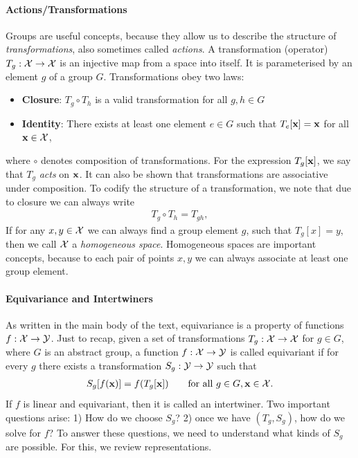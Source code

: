 \paragraph{Actions/Transformations}
Groups are useful concepts, because they allow us to describe the structure of \emph{transformations}, also sometimes called \emph{actions}. A transformation (operator) $T_g: \mathcal{X} \to \mathcal{X}$ is an injective map from a space into itself. It is parameterised by an element $g$ of a group $G$. Transformations obey two laws:
\begin{itemize}
    \item \textbf{Closure}: $T_g \circ T_h$ is a valid transformation for all $g, h \in G$
    \item \textbf{Identity}: There exists at least one element $e \in G$ such that $T_e[\textbf{x}] = \textbf{x}$ for all $\textbf{x} \in \mathcal{X}$,
\end{itemize}
where $\circ$ denotes composition of transformations. For the expression $T_g[\textbf{x}]$, we say that $T_g$ \emph{acts} on $\textbf{x}$. It can also be shown that transformations are associative under composition. To codify the structure of a transformation, we note that due to closure we can always write
\begin{align}
    T_g \circ T_h = T_{gh},
\end{align}
If for any $x, y \in \mathcal{X}$ we can always find a group element $g$, such that $T_g[x] = y$, then we call $\mathcal{X}$ a \emph{homogeneous space}. Homogeneous spaces are important concepts, because to each pair of points $x, y$ we can always associate at least one group element.

\paragraph{Equivariance and Intertwiners}
As written in the main body of the text, equivariance is a property of functions $f: \mathcal{X} \to \mathcal{Y}$. Just to recap, given a set of transformations $T_g: \mathcal{X} \to \mathcal{X}$ for $g \in G$, where $G$ is an abstract group, a function $f: \mathcal{X} \to \mathcal{Y}$ is called equivariant if for every $g$ there exists a transformation $S_g: \mathcal{Y} \to \mathcal{Y}$ such that
\begin{align}
    S_g[f(\textbf{x})] = f(T_g[\textbf{x}]) \qquad \text{for all } g\in G, \textbf{x}\in \mathcal{X}.
\end{align}
If $f$ is linear and equivariant, then it is called an intertwiner. Two important questions arise: 1) How do we choose $S_g$? 2) once we have $(T_g, S_g)$, how do we solve for $f$? To answer these questions, we need to understand what kinds of $S_g$ are possible. For this, we review representations.

